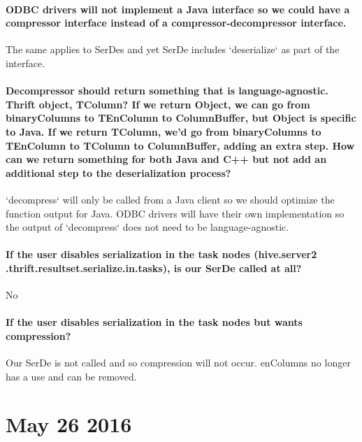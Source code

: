 \documentclass[11pt,a4paper]{article}
\begin{document}
	\paragraph{ODBC drivers will not implement a Java interface so we could have a compressor interface instead of a compressor-decompressor interface.}
	The same applies to SerDes and yet SerDe includes `deserialize` as part of the interface.
	
	\paragraph{Decompressor should return something that is language-agnostic. Thrift object, TColumn? If we return Object, we can go from binaryColumns to TEnColumn to ColumnBuffer, but Object is specific to Java. If we return TColumn, we'd go from binaryColumns to TEnColumn to TColumn to ColumnBuffer, adding an extra step. How can we return something for both Java and C++ but not add an additional step to the deserialization process?}
	`decompress` will only be called from a Java client so we should optimize the function output for Java. ODBC drivers will have their own implementation so the output of `decompress` does not need to be language-agnostic.
	
	\paragraph{If the user disables serialization in the task nodes (hive.server2 .thrift.resultset.serialize.in.tasks), is our SerDe called at all?}
	No
	
	\paragraph{If the user disables serialization in the task nodes but wants compression?}
	Our SerDe is not called and so compression will not occur. enColumns no longer has a use and can be removed.
	
\section*{May 26 2016}
	
\end{document}

